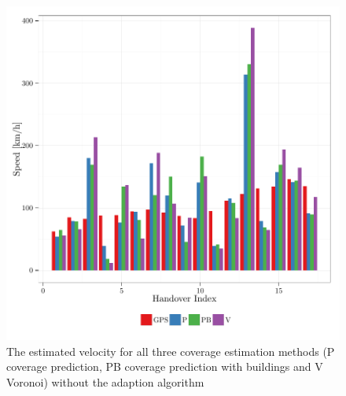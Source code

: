 	\begin{figure}[h!]
		\label{fig:velocity}
		\caption{ The estimated velocity for all three coverage estimation methods (P coverage prediction, PB coverage prediction with buildings and V Voronoi) without the adaption algorithm
		}
		\includegraphics[width=0.9\columnwidth]{images/563_SpeedWithoutAdaption}
	\end{figure}

